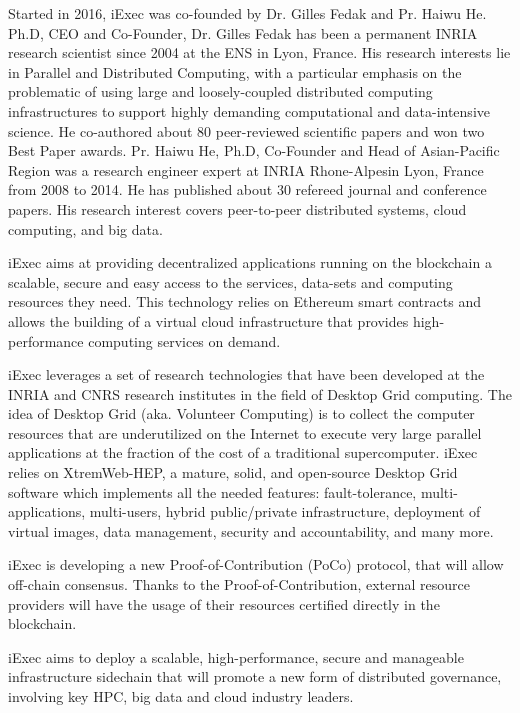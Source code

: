   Started in 2016, iExec\cite{iExec} was co-founded by Dr. Gilles Fedak and Pr. Haiwu He.\\
  Ph.D, CEO and Co-Founder, Dr. Gilles Fedak has been a permanent INRIA research scientist since
  2004 at the ENS in Lyon, France. His research interests lie in Parallel and Distributed
  Computing, with a particular emphasis on the problematic of using large and loosely-coupled
  distributed computing infrastructures to support highly demanding computational and
  data-intensive science. He co-authored about 80 peer-reviewed scientific papers and won two
  Best Paper awards. Pr. Haiwu He, Ph.D, Co-Founder and Head of Asian-Pacific Region was a
  research engineer expert at INRIA Rhone-Alpesin Lyon, France from 2008 to 2014. He has
  published about 30 refereed journal and conference papers. His research interest covers
  peer-to-peer distributed systems, cloud computing, and big data.

  iExec aims at providing decentralized applications running on the blockchain a scalable,
  secure and easy access to the services, data-sets and computing resources they need. This
  technology relies on Ethereum smart contracts and allows the building of a virtual cloud
  infrastructure that provides high-performance computing services on demand.

  iExec leverages a set of research technologies that have been developed at the INRIA and CNRS
  research institutes in the field of Desktop Grid computing. The idea of Desktop Grid
  (aka. Volunteer Computing) is to collect the computer resources that are underutilized on the
  Internet to execute very large parallel applications at the fraction of the cost of a
  traditional supercomputer. iExec relies on XtremWeb-HEP\cite{xtremweb}, a mature, solid, and open-source Desktop
  Grid software which implements all the needed features: fault-tolerance, multi-applications,
  multi-users, hybrid public/private infrastructure, deployment of virtual images, data management,
  security and accountability, and many more.

  iExec is developing a new Proof-of-Contribution\cite{POCO} (PoCo) protocol, that will allow off-chain
  consensus. Thanks to the Proof-of-Contribution, external resource providers will have the usage
  of their resources certified directly in the blockchain.

  iExec aims to deploy a scalable, high-performance, secure and manageable infrastructure sidechain
  that will promote a new form of distributed governance, involving key HPC, big data and cloud
  industry leaders.

